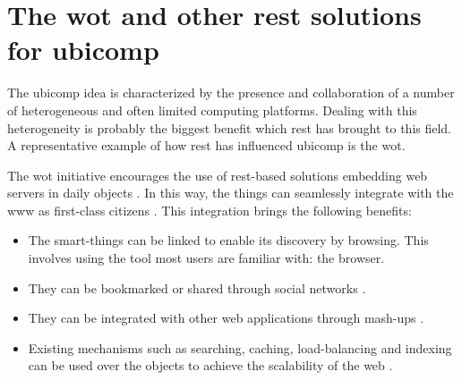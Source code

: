 \section{The \acl{wot} and other \ac{rest} solutions for \acs{ubicomp}}
\label{sec:soa_ubicomp}

The \ac{ubicomp} idea is characterized by the presence and collaboration of a number of heterogeneous and often limited computing platforms.
Dealing with this heterogeneity is probably the biggest benefit which \ac{rest} has brought to this field.
A representative example of how \ac{rest} has influenced \ac{ubicomp} is the \acf{wot}.




The \acl{wot} initiative encourages the use of \acs{rest}-based solutions embedding web servers in daily objects \citep{guinard_internet_2011,guinard_thesis_2011}.
In this way, the things can seamlessly integrate with the \ac{www} as first-class citizens \citep{gupta_network_2011}. %
This integration brings the following benefits:
\begin{itemize}
  \item The smart-things can be linked to enable its discovery by browsing.
	This involves using the tool most users are familiar with: the browser.
  \item They can be bookmarked or shared through social networks \citep{guinard_sharing_2010}.
  \item They can be integrated with other web applications through mash-ups \citep{guinard_towards_2009,ostermaier_webplug:_2010,pintus_anatomy_2011,blackstock_wotkit:_2012,stirbu_towards_2008}.
  \item Existing mechanisms such as searching, caching, load-balancing and indexing can be used over the objects to achieve the scalability of the web \citep{gupta_early_2010}.
\end{itemize}





